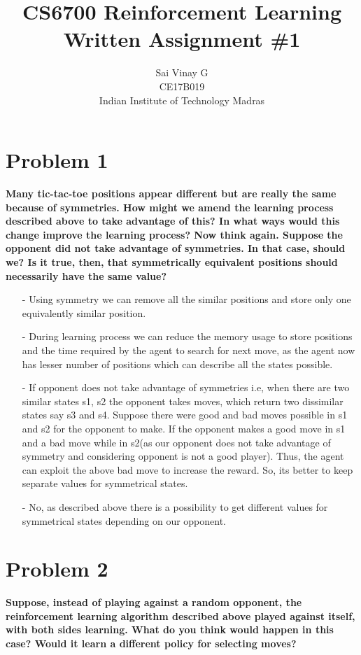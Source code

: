 \documentclass [11pt]{article}
\title{CS6700 Reinforcement Learning\\
\medskip Written Assignment \#1}
\author{Sai Vinay G \\
CE17B019    \\
Indian Institute of Technology Madras }
\numberwithin{equation}{section}
\begin{document}
\maketitle
\section*{Problem 1}
\textbf{Many tic-tac-toe positions appear different but are really the same because of symmetries. How might we amend the learning process described above to take advantage of
this? In what ways would this change improve the learning process?
Now think again. Suppose the opponent did not take advantage of symmetries. In
that case, should we? Is it true, then, that symmetrically equivalent positions should
necessarily have the same value?}

\begin{itemize}
\item[-] Using symmetry we can remove all the similar positions and store only one equivalently similar position.

\item[-] During learning process we can reduce the memory usage to store positions and the time required by the agent to search for next move, as the agent now has lesser number of positions which can describe all the states possible.  

\item[-] If opponent does not take advantage of symmetries i.e, when there are two similar states s1, s2 the opponent takes moves, which return two dissimilar states  
say s3 and s4. Suppose there were good and bad moves possible in s1 and s2 for the opponent to make. If the opponent makes a good move in s1 and a bad move while in s2(as our opponent does not take advantage of symmetry and considering opponent is not a good player). Thus, the agent can exploit the above bad move to increase the reward. So, its better to keep separate values for symmetrical states.

\item[-] No, as described above there is a possibility to get different values for symmetrical states depending on our opponent. 
\end{itemize}

\vspace{0.5cm}

\section*{Problem 2}
\textbf{Suppose, instead of playing against a random opponent, the reinforcement learning algorithm described above played against itself, with both sides learning. What do you think would happen in this case? Would it learn a different policy for selecting moves?}
\end{document}
